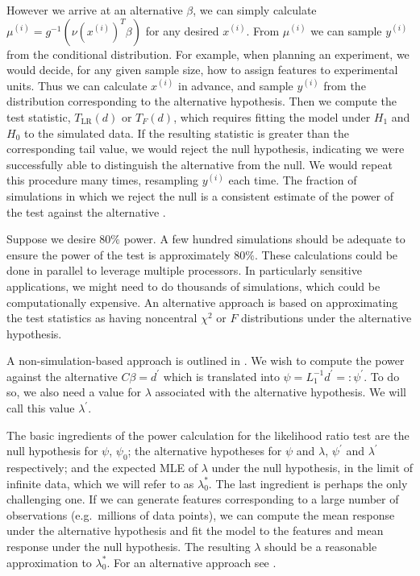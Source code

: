 \documentclass[12pt]{article}
\begin{document}
However we arrive at an alternative $\beta$, we can simply calculate $\mu^{(i)} = g^{-1}(\nu(x^{(i)})^T \beta)$ for any desired $x^{(i)}$. From $\mu^{(i)}$ we can sample $y^{(i)}$ from the conditional distribution. For example, when planning an experiment, we would decide, for any given sample size, how to assign features to experimental units. Thus we can calculate $x^{(i)}$ in advance, and sample $y^{(i)}$ from the distribution corresponding to the alternative hypothesis. Then we compute the test statistic, $T_{\textrm{LR}}(d)$ or $T_F(d)$, which requires fitting the model under $H_1$ and $H_0$ to the simulated data. If the resulting statistic is greater than the corresponding tail value, we would reject the null hypothesis, indicating we were successfully able to distinguish the alternative from the null. We would repeat this procedure many times, resampling $y^{(i)}$  each time. The fraction of simulations in which we reject the null is a consistent estimate of the power of the test against the alternative \cite{JBFM:15}. 

Suppose we desire $80\%$ power. A few hundred simulations should be adequate to ensure the power of the test is approximately $80\%$. These calculations could be done in parallel to leverage multiple processors. In particularly sensitive applications, we might need to do thousands of simulations, which could be computationally expensive. An alternative approach is based on approximating the test statistics as having noncentral $\chi^2$ or $F$ distributions under the alternative hypothesis. 

A non-simulation-based approach is outlined in \cite{SM:88}. We wish to compute the power against the alternative $C \beta = d^\prime$ which is translated into $\psi = L_1^{-1} d^\prime =: \psi^\prime$. To do so, we also need a value for $\lambda$ associated with the alternative hypothesis. We will call this value $\lambda^\prime$.

The basic ingredients of the power calculation for the likelihood ratio test are the null hypothesis for $\psi$, $\psi_0$; the alternative hypotheses for $\psi$ and $\lambda$, $\psi^\prime$ and $\lambda^\prime$ respectively; and the expected MLE of $\lambda$ under the null hypothesis, in the limit of infinite data, which we will refer to as $\lambda_0^*$. The last ingredient is perhaps the only challenging one. If we can generate features corresponding to a large number of observations (e.g.~millions of data points), we can compute the mean response under the alternative hypothesis and fit the model to the features and mean response under the null hypothesis. The resulting $\lambda$ should be a reasonable approximation to $\lambda_0^*$. For an alternative approach see \cite{SM:88}.
\end{document}
